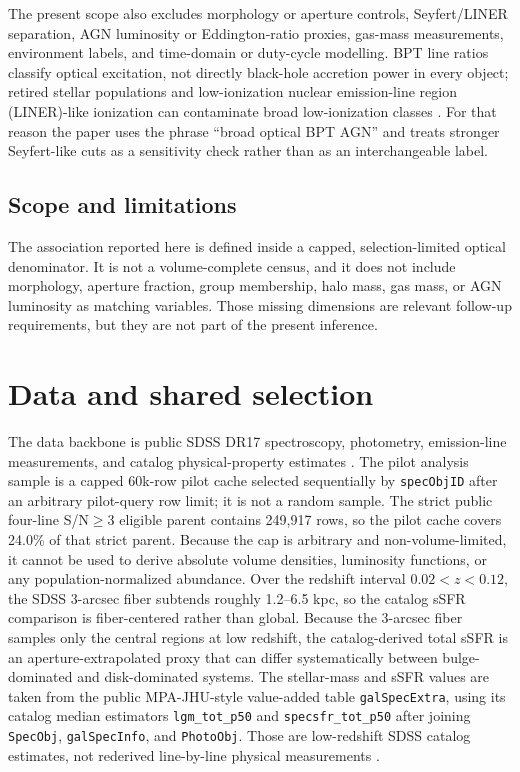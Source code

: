 \documentclass[twocolumn]{aastex631}
\begin{document}
The present scope also excludes morphology or aperture controls, Seyfert/LINER separation, AGN luminosity or Eddington-ratio proxies, gas-mass measurements, environment labels, and time-domain or duty-cycle modelling. BPT line ratios classify optical excitation, not directly black-hole accretion power in every object; retired stellar populations and low-ionization nuclear emission-line region (LINER)-like ionization can contaminate broad low-ionization classes \citep{stasinska2008,stasinska2015}. For that reason the paper uses the phrase ``broad optical BPT AGN'' and treats stronger Seyfert-like cuts as a sensitivity check rather than as an interchangeable label.

\subsection{Scope and limitations}
The association reported here is defined inside a capped, selection-limited optical denominator. It is not a volume-complete census, and it does not include morphology, aperture fraction, group membership, halo mass, gas mass, or AGN luminosity as matching variables. Those missing dimensions are relevant follow-up requirements, but they are not part of the present inference.

\section{Data and shared selection}
The data backbone is public SDSS DR17 spectroscopy, photometry, emission-line measurements, and catalog physical-property estimates \citep{york2000,sdssdr17,brinchmann2004}. The pilot analysis sample is a capped 60k-row pilot cache selected sequentially by \texttt{specObjID} after an arbitrary pilot-query row limit; it is not a random sample. The strict public four-line S/N$\geq3$ eligible parent contains 249,917 rows, so the pilot cache covers 24.0\% of that strict parent. Because the cap is arbitrary and non-volume-limited, it cannot be used to derive absolute volume densities, luminosity functions, or any population-normalized abundance.
Over the redshift interval $0.02<z<0.12$, the SDSS 3-arcsec fiber subtends roughly 1.2--6.5 kpc, so the catalog sSFR comparison is fiber-centered rather than global.
Because the 3-arcsec fiber samples only the central regions at low redshift, the catalog-derived total sSFR is an aperture-extrapolated proxy that can differ systematically between bulge-dominated and disk-dominated systems.
The stellar-mass and sSFR values are taken from the public MPA-JHU-style value-added table \texttt{galSpecExtra}, using its catalog median estimators \texttt{lgm\_tot\_p50} and \texttt{specsfr\_tot\_p50} after joining \texttt{SpecObj}, \texttt{galSpecInfo}, and \texttt{PhotoObj}. Those are low-redshift SDSS catalog estimates, not rederived line-by-line physical measurements \citep{brinchmann2004,sdssdr17,york2000}.
\end{document}
